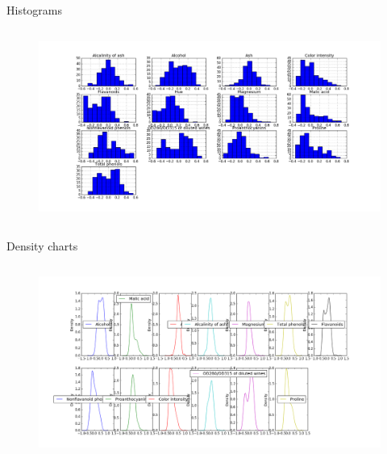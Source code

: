 \documentclass[xcolor=x11names,compress]{beamer}
\renewcommand{\(}{\begin{columns}}
\renewcommand{\)}{\end{columns}}
\newcommand{\<}[1]{\begin{column}{#1}}
\renewcommand{\>}{\end{column}}
\begin{document}
\begin{frame}{Histograms}
	\begin{columns}
	\column{\dimexpr\paperwidth-20pt}

        \begin{figure}\includegraphics[width=1\textwidth]{hist_chart.png} \end{figure}
 \end{columns}

\end{frame}

\begin{frame}{Density charts}
	\begin{columns}
	\column{\dimexpr\paperwidth-20pt}

        \begin{figure}\includegraphics[width=1\textwidth]{density_chart.png} \end{figure}
 \end{columns}
\end{frame}

%
%
\end{document}
